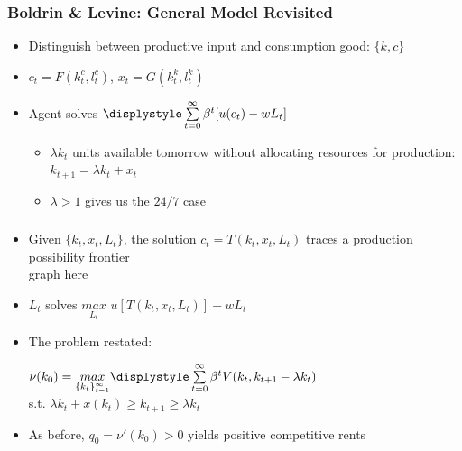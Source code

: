 \documentclass{beamer}
\begin{document}
\begin{frame}
  \frametitle{Boldrin \& Levine: General Model Revisited}
  \begin{itemize}
    \item Distinguish between productive input and consumption good: $\{k,c\}$
	\item $c_t = F(k_t^c,l_t^c)$, $x_t = G(k_t^k,l_t^k)$
	\item Agent solves $\displystyle\sum\limits_{t=0}^\infty\beta^t[u(c_t)-wL_t]$
	\begin{itemize}
	  \item $\lambda k_t$ units available tomorrow without allocating 			resources for production: $k_{t+1} = \lambda k_t + x_t$
	  \item $\lambda > 1$ gives us the $24/7$ case
	\end{itemize}
  \end{itemize}
\end{frame}

\begin{frame}
	\frametitle{}
  \begin{itemize}
    \item Given $\{k_t, x_t, L_t\}$, the solution $c_t = T(k_t,x_t,L_t)$ traces a 		 production possibility frontier\\
	   graph here
	\item $L_t$ solves $\underset{L_t}{max}$ $u[T(k_t,x_t,L_t)]-wL_t$
	\item The problem restated:\\
	\begin{centering}
	  $\nu(k_0)=
		\underset{\{k_t\}_{t=1}^\infty}{max}\displystyle\sum\limits_{t=0}^\infty\beta		 ^tV(k_t,k_{t+1} - \lambda k_t)$\\
	    \hspace{13mm}
		s.t. $\lambda k_t + \overline{x}(k_t) \ge k_{t+1} \ge \lambda k_t$
	\end{centering}
	\item As before, $q_0 = \nu ' (k_0) > 0$ yields positive competitive rents
  \end{itemize}	
\end{frame}
\end{document}
